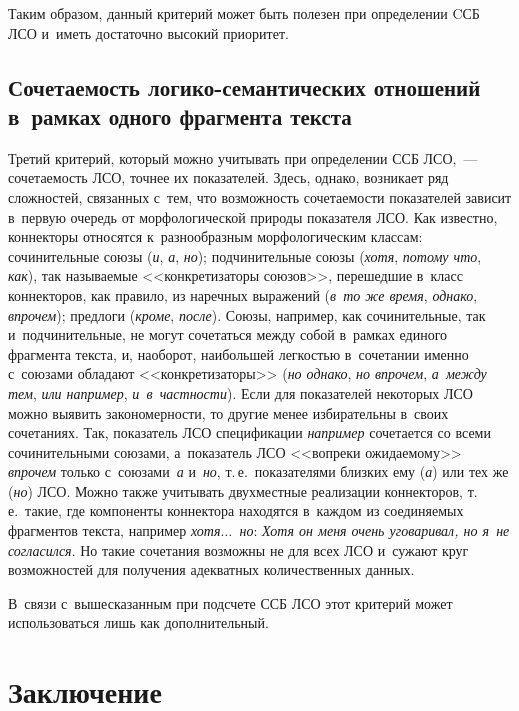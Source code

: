 \begin{multicols}{2}
  Таким образом, данный критерий может быть полезен при определении CСБ 
ЛСО и~иметь достаточно высокий приоритет.
  
\subsection{Сочетаемость логико-семантических отношений в~рамках одного фрагмента текста}

  Третий критерий, который можно учитывать при определении ССБ ЛСО,~--- 
сочетаемость ЛСО, точнее их показателей. Здесь, однако, возникает ряд 
сложностей, связанных с~тем, что возможность сочетаемости показателей 
зависит в~первую очередь от морфологической природы показателя ЛСО. Как 
известно, коннекторы относятся к~разнообразным морфологическим классам: 
сочинительные со\-юзы (\textit{и}, \textit{а}, \textit{но}); подчинительные союзы 
(\textit{хотя}, \textit{потому что}, \textit{как}), так называемые 
<<конкретизаторы со\-юзов>>, перешедшие в~класс коннекторов, как правило, из 
наречных выражений (\textit{в~то же время}, \textit{однако}, \textit{впрочем}); 
предлоги (\textit{кроме}, \textit{после}). Союзы, например, как сочинительные, 
так и~подчинительные, не могут сочетаться между собой в~рамках единого 
фрагмента текста, и, наоборот, наибольшей легкостью в~сочетании именно с~союзами обладают <<конкретизаторы>> (\textit{но однако}, \textit{но впрочем}, 
\textit{а~между тем}, \textit{или например}, \textit{и~в~частности}). Если для 
показателей некоторых ЛСО можно выявить закономерности, то другие менее 
избирательны в~своих сочетаниях. Так, показатель ЛСО спецификации 
\textit{например} сочетается со всеми сочинительными союзами, а~показатель 
ЛСО <<вопреки ожидаемому>> \textit{впрочем} только с~союзами~\textit{а} 
и~\textit{но}, т.\,е.\ показателями близких ему (\textit{а}) или тех же (\textit{но}) 
ЛСО. Можно также учитывать двухместные реализации коннекторов, т.\,е.\ 
такие, где компоненты коннектора находятся в~каждом из соединяемых 
фрагментов текста, например \textit{хотя$\ldots$\ но}: \textit{Хотя он меня 
очень уговаривал, но я~не согласился}. Но такие сочетания возможны не для 
всех ЛСО и~сужают круг возможностей для получения адекватных 
количественных данных.
 
  В~связи с~вышесказанным при подсчете ССБ ЛСО этот критерий может 
использоваться лишь как дополнительный.
  
\section{Заключение}


\end{multicols}
